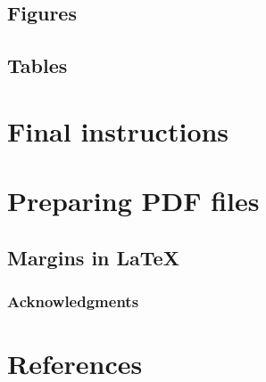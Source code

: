 \documentclass{article}
\begin{document}
\subsection{Figures}
\subsection{Tables}
\section{Final instructions}
\section{Preparing PDF files}
\subsection{Margins in \LaTeX{}}
\subsubsection*{Acknowledgments}
\section*{References}
{}
	
\end{document}
